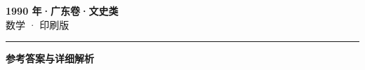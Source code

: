\documentclass[zihao=5, a4paper]{ctexart}
\begin{document}
\begin{center}
  {\Large\bfseries 1990 年·广东卷·文史类}\\[4pt]
  {\large 数学 · 印刷版}
\end{center}
\medskip
{}

\par\bigskip\hrule\bigskip
{}
\begin{center}{\large\bfseries 参考答案与详细解析}\end{center}
\smallskip

\end{document}
